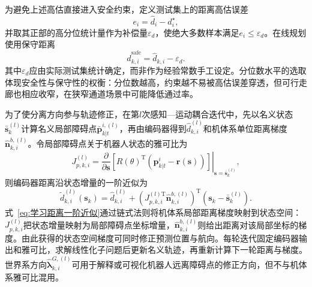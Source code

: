 为避免上述高估直接进入安全约束，定义测试集上的距离高估误差
\begin{equation}
	e_i
	=
	\hat d_i-d_i^{\star},
	\label{eq:编码器距离高估误差}
\end{equation}
并取其正部的高分位统计量作为补偿量$\varepsilon_d$，使绝大多数样本满足$e_i\leq\varepsilon_d$。在线规划使用保守距离
\begin{equation}
	\hat d_{k,i}^{\mathrm{safe}}
	=
	\hat d_{k,i}-\varepsilon_d.
	\label{eq:编码器距离误差补偿}
\end{equation}
其中$\varepsilon_d$应由实际测试集统计确定，而非作为经验常数手工设定。分位数水平的选取体现安全性与保守性的权衡：分位数越高，约束越不易被高估误差穿透，但可行走廊也相应收窄，在狭窄通道场景中可能降低通过率。

为了使分离方向参与轨迹修正，在第$l$次感知—运动耦合迭代中，先以名义状态$\bar{\mathbf{s}}_k^{(l)}$计算名义局部障碍点$\bar{\mathbf{p}}_{k|t}^{i,(l)}$，再由编码器得到$\hat d_{k,i}^{(l)}$和机体系单位距离梯度$\hat{\mathbf n}_{k,i}^{b,(l)}$。令局部障碍点关于机器人状态的雅可比为
\begin{equation}
	J_{p,k,i}^{(l)}
	=
	\left.
	\frac{\partial}{\partial\mathbf{s}}
	\left[
	R(\theta)^{\mathrm{T}}
	\left(\mathbf{p}_{k|t}^{i}-\mathbf{r}(\mathbf{s})\right)
	\right]
	\right|_{\mathbf{s}=\bar{\mathbf{s}}_k^{(l)}},
	\label{eq:局部障碍点状态雅可比}
\end{equation}
则编码器距离沿状态增量的一阶近似为
\begin{equation}
    \tilde d_{k,i}^{(l)}(\mathbf{s}_k)
    =\hat d_{k,i}^{(l)}
    +\left(J_{p,k,i}^{(l)\mathrm{T}}\hat{\mathbf n}_{k,i}^{b,(l)}\right)^{\mathrm{T}}
    \left(\mathbf{s}_k-\bar{\mathbf{s}}_k^{(l)}\right).
    \label{eq:学习距离一阶近似}
\end{equation}
式~\eqref{eq:学习距离一阶近似}通过链式法则将机体系局部距离梯度映射到状态空间：$J_{p,k,i}^{(l)}$把状态增量映射为局部障碍点坐标增量，$\hat{\mathbf n}_{k,i}^{b,(l)}$则给出距离对该局部坐标的梯度。由此获得的状态空间梯度可同时修正预测位置与航向。每轮迭代固定编码器输出和雅可比，求解线性化子问题后更新名义轨迹，再重新计算下一轮距离与梯度。世界系方向$\hat{\boldsymbol\lambda}_{k,i}^{G,(l)}$可用于解释或可视化机器人远离障碍点的修正方向，但不与机体系雅可比混用。

